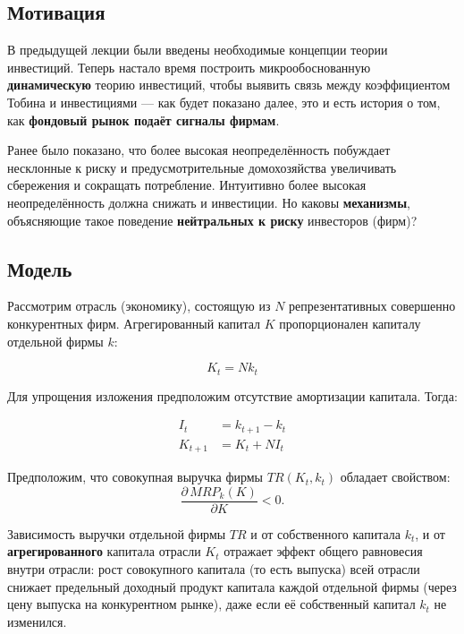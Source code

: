 \documentclass[10pt,a4paper]{article}
\begin{document}
\subsection{Мотивация}

В предыдущей лекции были введены необходимые концепции теории инвестиций. Теперь настало время построить микрообоснованную \textbf{динамическую} теорию инвестиций, чтобы выявить связь между коэффициентом Тобина и инвестициями — как будет показано далее, это и есть история о том, как \textbf{фондовый рынок подаёт сигналы фирмам}.

Ранее было показано, что более высокая неопределённость побуждает несклонные к риску и предусмотрительные домохозяйства увеличивать сбережения и сокращать потребление. Интуитивно более высокая неопределённость должна снижать и инвестиции. Но каковы \textbf{механизмы}, объясняющие такое поведение \textbf{нейтральных к риску} инвесторов (фирм)?

\subsection{Модель}

Рассмотрим отрасль (экономику), состоящую из $N$ репрезентативных совершенно конкурентных фирм. Агрегированный капитал $K$ пропорционален капиталу отдельной фирмы $k$:
\begin{formulabox}
\begin{equation}
K_t = N k_t \tag{9.1}
\end{equation}
\end{formulabox}

Для упрощения изложения предположим отсутствие амортизации капитала. Тогда:
\begin{formulabox}
\begin{align}
I_t &= k_{t+1} - k_t \tag{9.2}\\
K_{t+1} &= K_t + N I_t \tag{9.3}
\end{align}
\end{formulabox}

Предположим, что совокупная выручка фирмы $TR(K_t, k_t)$ обладает свойством:
$$\frac{\partial\, MRP_k(K)}{\partial K} < 0.$$

\begin{intuition}
Зависимость выручки отдельной фирмы $TR$ и от собственного капитала $k_t$, и от \textbf{агрегированного} капитала отрасли $K_t$ отражает эффект общего равновесия внутри отрасли: рост совокупного капитала (то есть выпуска) всей отрасли снижает предельный доходный продукт капитала каждой отдельной фирмы (через цену выпуска на конкурентном рынке), даже если её собственный капитал $k_t$ не изменился.
\end{intuition}
\end{document}
